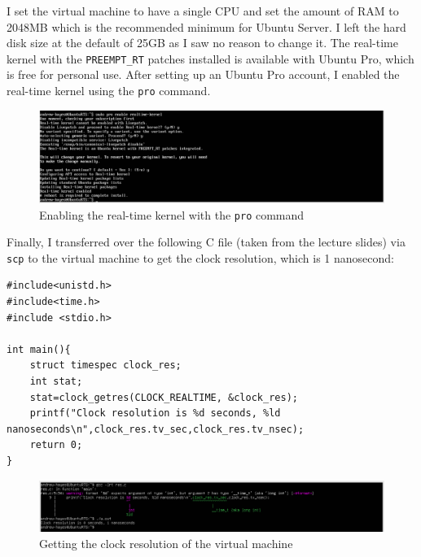 \documentclass[a4paper]{article}
\newenvironment{code}{\captionsetup{type=listing}}{}
\begin{document}
I set the virtual machine to have a single CPU and set the amount of RAM to 2048MB which is the recommended minimum for Ubuntu Server\supercite{ubuntu_server_installation}.
I left the hard disk size at the default of 25GB as I saw no reason to change it.
The real-time kernel with the \verb|PREEMPT_RT| patches installed is available with Ubuntu Pro, which is free for personal use.
After setting up an Ubuntu Pro account, I enabled the real-time kernel using the \texttt{pro} command.

\begin{figure}[H]
    \centering
    \includegraphics[width=\textwidth]{./images/proenable.png}
    \caption{Enabling the real-time kernel with the \texttt{pro} command}
\end{figure}

Finally, I transferred over the following C file (taken from the lecture slides) via \texttt{scp}\supercite{scp} to the virtual machine to get the clock resolution, which is 1 nanosecond:
\begin{code}
\begin{verbatim}
#include<unistd.h>
#include<time.h>
#include <stdio.h>

int main(){
    struct timespec clock_res;
    int stat;
    stat=clock_getres(CLOCK_REALTIME, &clock_res);
    printf("Clock resolution is %d seconds, %ld nanoseconds\n",clock_res.tv_sec,clock_res.tv_nsec);
    return 0;
}
\end{verbatim}
\end{code}

\begin{figure}[H]
    \centering
    \includegraphics[width=\textwidth]{./images/clockres.png}
    \caption{Getting the clock resolution of the virtual machine}
\end{figure}
\end{document}
